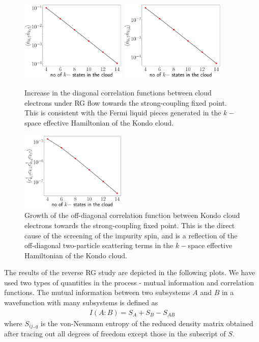\documentclass{report}
\numberwithin{equation}{section}
\begin{document}
\begin{figure}[!htbp]
	\centering
	\includegraphics[width=0.45\textwidth]{../figures/corr_same.pdf}
	\includegraphics[width=0.45\textwidth]{../figures/corr_opp.pdf}
	\caption{Increase in the diagonal correlation functions between cloud electrons under RG flow towards the strong-coupling fixed point. This is consistent with the Fermi liquid pieces generated in the \(k-\)space effective Hamiltonian of the Kondo cloud.}
\end{figure}

\begin{figure}[!htbp]
	\centering
	\includegraphics[width=0.45\textwidth]{../figures/corr_od.pdf}
	\caption{Growth of the off-diagonal correlation function between Kondo cloud electrons towards the strong-coupling fixed point. This is the direct cause of the screening of the impurity spin, and is a reflection of the off-diagonal two-particle scattering terms in the \(k-\)space effective Hamiltonian of the Kondo cloud.}
\end{figure}

The results of the reverse RG study are depicted in the following plots. We have used two types of quantities in the process - mutual information and correlation functions. The mutual information between two subsystems \(A\) and \(B\) in a wavefunction with many subsystems is defined as
\begin{equation}\begin{aligned}
	I(A: B) = S_A + S_B - S_{AB}
\end{aligned}\end{equation}
where \(S_{ij..q}\) is the von-Neumann entropy of the reduced density matrix obtained after tracing out all degrees of freedom except those in the subscript of \(S\).
\end{document}

